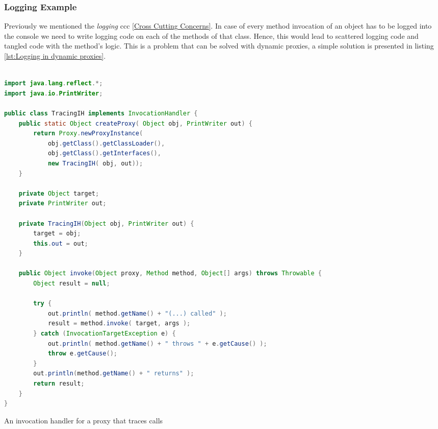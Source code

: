 \subsubsection{Logging Example}
Previously we mentioned the \textit{logging} \ac{ccc} \ref{Cross Cutting Concerns}.
In case of every method invocation of an object has to be logged into the console we need to write logging code on each of the methods of that class.
Hence, this would lead to scattered logging code and tangled code with the method's logic.
This is a problem that can be solved with dynamic proxies, a simple solution is presented in listing \ref{lst:Logging in dynamic proxies}.

\begin{sourcecode}
	\begin{lstlisting}[language=Java]

import java.lang.reflect.*;
import java.io.PrintWriter;

public class TracingIH implements InvocationHandler {
    public static Object createProxy( Object obj, PrintWriter out) {
        return Proxy.newProxyInstance(
            obj.getClass().getClassLoader(),
            obj.getClass().getInterfaces(),
            new TracingIH( obj, out));
    }

    private Object target;
    private PrintWriter out;

    private TracingIH(Object obj, PrintWriter out) {
        target = obj;
        this.out = out;
    }

    public Object invoke(Object proxy, Method method, Object[] args) throws Throwable {
        Object result = null;

        try {
            out.println( method.getName() + "(...) called" );
            result = method.invoke( target, args );
        } catch (InvocationTargetException e) {
            out.println( method.getName() + " throws " + e.getCause() );
            throw e.getCause();
        }
        out.println(method.getName() + " returns" );
        return result;
    }
}	

	\end{lstlisting}
	\caption{An invocation handler for a proxy that traces calls \cite{forman2004java}}
	\label{lst:Logging in dynamic proxies}
\end{sourcecode}

